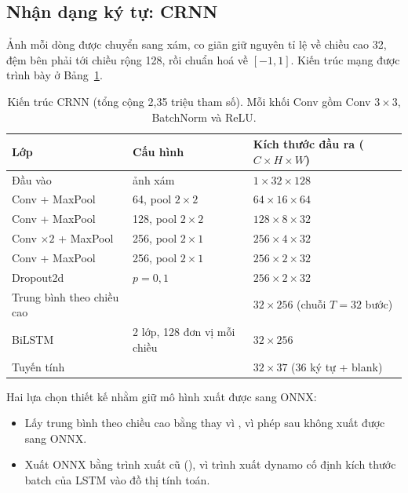 \subsection{Nhận dạng ký tự: CRNN}
Ảnh mỗi dòng được chuyển sang xám, co giãn giữ nguyên tỉ lệ về chiều cao 32, đệm bên phải tới chiều rộng 128, rồi chuẩn hoá về $[-1, 1]$. Kiến trúc mạng được trình bày ở Bảng~\ref{tab:crnn}.

\begin{table}[H]
\centering
\caption{Kiến trúc CRNN (tổng cộng 2,35 triệu tham số). Mỗi khối Conv gồm Conv $3\times3$, BatchNorm và ReLU.}
\label{tab:crnn}
\begin{tabular}{lll}
\toprule
Lớp & Cấu hình & Kích thước đầu ra ($C \times H \times W$) \\
\midrule
Đầu vào & ảnh xám & $1 \times 32 \times 128$ \\
Conv + MaxPool & 64, pool $2\times2$ & $64 \times 16 \times 64$ \\
Conv + MaxPool & 128, pool $2\times2$ & $128 \times 8 \times 32$ \\
Conv $\times 2$ + MaxPool & 256, pool $2\times1$ & $256 \times 4 \times 32$ \\
Conv + MaxPool & 256, pool $2\times1$ & $256 \times 2 \times 32$ \\
Dropout2d & $p = 0{,}1$ & $256 \times 2 \times 32$ \\
Trung bình theo chiều cao & & $32 \times 256$ (chuỗi $T = 32$ bước) \\
BiLSTM & 2 lớp, 128 đơn vị mỗi chiều & $32 \times 256$ \\
Tuyến tính & & $32 \times 37$ (36 ký tự + blank) \\
\bottomrule
\end{tabular}
\end{table}

Hai lựa chọn thiết kế nhằm giữ mô hình xuất được sang ONNX:
\begin{itemize}[nosep]
  \item Lấy trung bình theo chiều cao bằng  thay vì , vì phép sau không xuất được sang ONNX.
  \item Xuất ONNX bằng trình xuất cũ (), vì trình xuất dynamo cố định kích thước batch của LSTM vào đồ thị tính toán.
\end{itemize}

